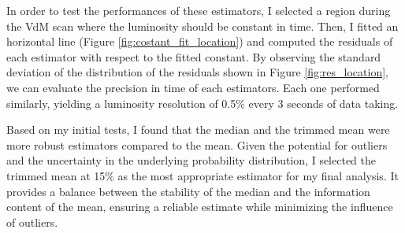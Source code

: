 In order to test the performances of these estimators, I selected a region during the VdM scan where the luminosity should be constant in time. Then, I fitted an horizontal line (Figure \ref{fig:costant_fit_location}) and computed the residuals of each estimator with respect to the fitted constant. By observing the standard deviation of the distribution of the residuals shown in Figure \ref{fig:res_location}, we can evaluate the precision in time of each estimators. Each one performed similarly, yielding a luminosity resolution of 0.5\% every 3 seconds of data taking.

Based on my initial tests, I found that the median and the trimmed mean were more robust estimators compared to the mean. Given the potential for outliers and the uncertainty in the underlying probability distribution, I selected the trimmed mean at 15\% as the most appropriate estimator for my final analysis. It provides a balance between the stability of the median and the information content of the mean, ensuring a reliable estimate while minimizing the influence of outliers.

